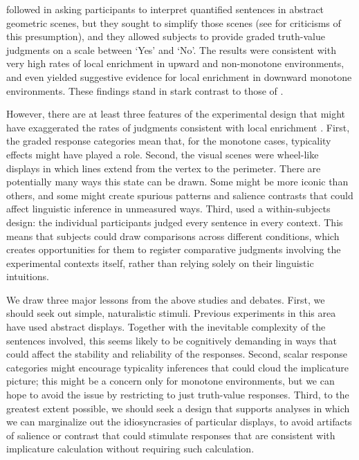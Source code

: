 \documentclass[leqno,12pt]{article}
\begin{document}
\citet{Chemla:Spector:2011} followed \citet{Geurts:Pouscoulous:2009}
in asking participants to interpret quantified sentences in abstract
geometric scenes, but they sought to simplify those scenes (see
 for criticisms of this
presumption), and they allowed subjects to provide graded truth-value
judgments on a scale between `Yes' and `No'. The results were
consistent with very high rates of local enrichment in upward and
non-monotone environments, and even yielded suggestive evidence for
local enrichment in downward monotone environments. These findings
stand in stark contrast to those of \citet{Geurts:Pouscoulous:2009}.

However, there are at least three features of the experimental design
that might have exaggerated the rates of judgments consistent with
local enrichment \citep{geurts-vantiel:2013:scalar}. First, the graded
response categories mean that, for the monotone cases, typicality
effects might have played a role. Second, the visual scenes were
wheel-like displays in which lines extend from the vertex to the
perimeter. There are potentially many ways this state can be drawn.
Some might be more iconic than others, and some might create spurious
patterns and salience contrasts that could affect linguistic inference
in unmeasured ways. Third, \citeauthor{Chemla:Spector:2011} used a
within-subjects design: the individual participants judged every
sentence in every context. This means that subjects could draw
comparisons across different conditions, which creates opportunities
for them to register comparative judgments involving the experimental
contexts itself, rather than relying solely on their linguistic
intuitions.

We draw three major lessons from the above studies and debates. First,
we should seek out simple, naturalistic stimuli. Previous experiments
in this area have used abstract displays. Together with the inevitable
complexity of the sentences involved, this seems likely to be
cognitively demanding in ways that could affect the stability and
reliability of the responses. Second, scalar response categories might
encourage typicality inferences that could cloud the implicature
picture; this might be a concern only for monotone environments, but
we can hope to avoid the issue by restricting to just truth-value
responses. Third, to the greatest extent possible, we should seek a
design that supports analyses in which we can marginalize out the
idiosyncrasies of particular displays, to avoid artifacts of salience
or contrast that could stimulate responses that are consistent with
implicature calculation without requiring such calculation.
\end{document}
